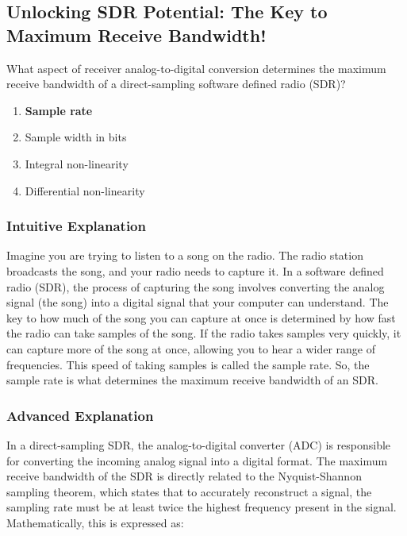 \subsection{Unlocking SDR Potential: The Key to Maximum Receive Bandwidth!}

\begin{tcolorbox}[colback=gray!10!white,colframe=black!75!black,title=E7F10] What aspect of receiver analog-to-digital conversion determines the maximum receive bandwidth of a direct-sampling software defined radio (SDR)?
    \begin{enumerate}[label=\Alph*.]
        \item \textbf{Sample rate}
        \item Sample width in bits
        \item Integral non-linearity
        \item Differential non-linearity
    \end{enumerate}
\end{tcolorbox}

\subsubsection{Intuitive Explanation}
Imagine you are trying to listen to a song on the radio. The radio station broadcasts the song, and your radio needs to capture it. In a software defined radio (SDR), the process of capturing the song involves converting the analog signal (the song) into a digital signal that your computer can understand. The key to how much of the song you can capture at once is determined by how fast the radio can take samples of the song. If the radio takes samples very quickly, it can capture more of the song at once, allowing you to hear a wider range of frequencies. This speed of taking samples is called the sample rate. So, the sample rate is what determines the maximum receive bandwidth of an SDR.

\subsubsection{Advanced Explanation}
In a direct-sampling SDR, the analog-to-digital converter (ADC) is responsible for converting the incoming analog signal into a digital format. The maximum receive bandwidth of the SDR is directly related to the Nyquist-Shannon sampling theorem, which states that to accurately reconstruct a signal, the sampling rate must be at least twice the highest frequency present in the signal. Mathematically, this is expressed as:

